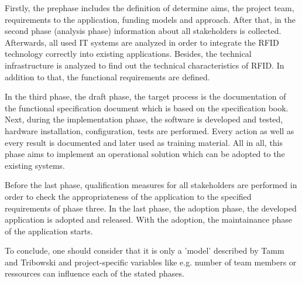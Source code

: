 Firstly, the prephase includes the definition of determine aims, the project team, requirements to the application, funding models and approach. After that, in the second phase (analysis phase) information about all stakeholders is collected. Afterwards, all used IT systems are analyzed in order to integrate the RFID technology correctly into existing applications. Besides, the technical infrastructure is analyzed to find out the technical characteristics of RFID. In addition to that, the functional requirements are defined.

In the third phase, the draft phase, the target process is the documentation of the functional specification document which is based on the specification book. Next, during the implementation phase, the software is developed and tested, hardware installation, configuration, tests are performed. Every action as well as every result is documented and later used as training material. All in all, this phase aims to implement an operational solution which can be adopted to the existing systems. 

Before the last phase, qualification measures for all stakeholders are performed in order to check the appropriateness of the application to the specified requirements of phase three.
In the last phase, the adoption phase, the developed application is adopted and released. With the adoption, the maintainance phase of the application starts.

To conclude, one should consider that it is only a 'model' described by Tamm and Tribowski \cite[p.59 ff.]{fokus}and project-specific variables like e.g. number of team members or ressources can influence each of the stated phases.